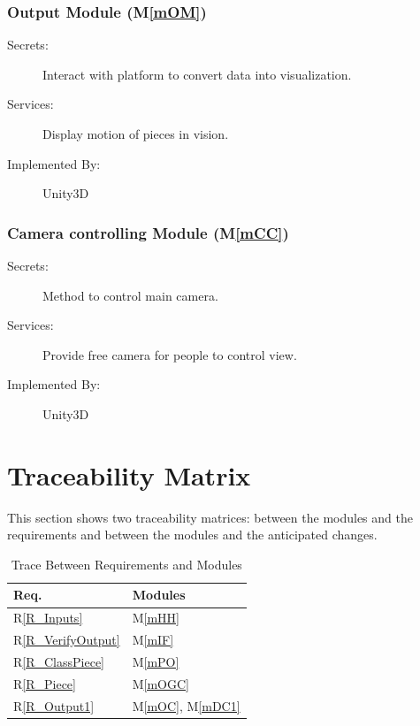 \documentclass[12pt, titlepage]{article}
\newcommand{\rref}[1]{R\ref{#1}}
\newcommand{\mref}[1]{M\ref{#1}}
\begin{document}
	\subsubsection{Output Module (\mref{mOM})}
	
	\begin{description}
		\item[Secrets:] Interact with platform to convert data into visualization.
		\item[Services:] Display motion of pieces in vision. 
		\item[Implemented By:] Unity3D
		\end{description}
	
	\subsubsection{Camera controlling Module (\mref{mCC})}
	
	\begin{description}
		\item[Secrets:] Method to control main camera.
		\item[Services:] Provide free camera for people to control view.
		\item[Implemented By:] Unity3D
	\end{description}
	
	\section{Traceability Matrix} \label{SecTM}
	
	This section shows two traceability matrices: between the modules and the
	requirements and between the modules and the anticipated changes.
	
	\begin{table}[H]
		\centering
		\begin{tabular}{p{} p{}}
			\toprule
			\textbf{Req.} & \textbf{Modules}\\
			\midrule
			\rref{R_Inputs} & \mref{mHH}\\
			\rref{R_VerifyOutput} & \mref{mIF}\\
			\rref{R_ClassPiece} & \mref{mPO}\\
			\rref{R_Piece} & \mref{mOGC}\\
			\rref{R_Output1} & \mref{mOC}, \mref{mDC1}\\
			\bottomrule
		\end{tabular}
		\caption{Trace Between Requirements and Modules}
		\label{TblRT}
	\end{table}
	
\end{document}
